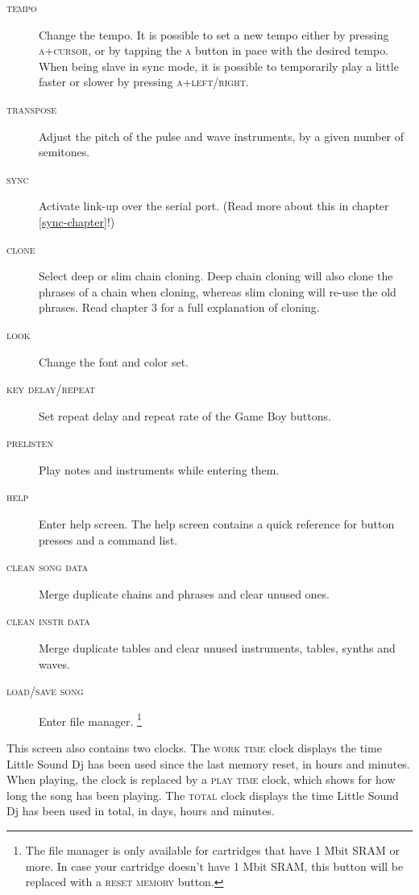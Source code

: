 \begin{description}
	\item[\textsc{tempo}] Change the tempo. It is possible to set a new tempo either by pressing
\textsc{a+cursor}, or by tapping the \textsc{a} button in pace with the desired tempo. When being
slave in sync mode, it is possible to temporarily play a little faster or slower by pressing \textsc{a+left/right}.
	\item[\textsc{transpose}] Adjust the pitch of the pulse and wave instruments, by a given number of semitones.
	\item[\textsc{sync}] Activate link-up over the serial port. (Read more about this in chapter \ref{sync-chapter}!)

	\item[\textsc{clone}] Select deep or slim chain cloning. Deep chain cloning will also clone the phrases of a chain when cloning, whereas slim cloning will re-use the old phrases. Read chapter 3 for a full explanation of cloning.
	\item[\textsc{look}] Change the font and color set.
	\item[\textsc{key delay/repeat}] Set repeat delay and repeat rate of the Game Boy buttons.
	\item[\textsc{prelisten}] Play notes and instruments while entering them.

	\item[\textsc{help}] Enter help screen. The help screen contains a quick reference for button presses and a command list.
	\item[\textsc{clean song data}] Merge duplicate chains and phrases and clear unused ones. \label{clean-song-data}
	\item[\textsc{clean instr data}] Merge duplicate tables and clear unused instruments, tables, synths and waves.
	\item[\textsc{load/save song}] Enter file manager. \footnote{The file manager is only available for cartridges that have 1 Mbit SRAM or more. In case your cartridge doesn't have 1 Mbit SRAM, this button will be replaced with a \textsc{reset memory} button.}
\end{description}

This screen also contains two clocks. The \textsc{work time} clock displays the time Little Sound Dj has been used since the last memory reset, in hours and minutes. When playing, the clock
is replaced by a \textsc{play time} clock, which shows for how long the song has been playing. The \textsc{total} clock displays the time Little Sound Dj has been used in total, in days, hours and minutes.

